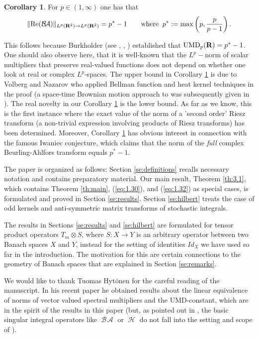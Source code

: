 \documentclass[11pt,a4paper,twoside,draft]{amsart}
\theoremstyle{definition}
\newtheorem{corollary}[lemma]{Corollary}
\newcommand{\real}{{\bf R}}
\DeclareMathOperator{\htt}{{\mathcal H}}
\DeclareMathOperator{\ba}{{\mathcal B\!\mathcal A}}
\DeclareMathOperator{\umd}{{\rm UMD}}
\newcommand{\refeq}[1]{(\ref{#1})}
\begin{document}
\begin{corollary}\label{cor:nice}
For $p\in (1,\infty)$ one has that
\[   \|{\rm Re}(\ba) \|_{L^p(\real^2)\to L^p(\real^2)}
   = p^*-1
   \qquad \mbox{where}\;\; 
   p^*:=\max \left (p,\frac{p}{p-1}\right ). \]
\end{corollary}
\noindent This follows  because Burkholder 
(see \cite{Burk5},
     \cite[Theorem 14]{Burk3},
     \cite[p.12]{Burk4}) 
established that 
$\umd_p(\real )=p^*-1$. One should also observe here, that it is well-known that the $L^p-$norm of
scalar multipliers that preserve real-valued functions does not depend on whether one look at
real or complex $L^p$-spaces. The upper bound in Corollary \ref{cor:nice} is due to
Volberg and Nazarov \cite[Theorem 3.1]{Volberg} who applied Bellman function and heat kernel techniques
in the proof (a space-time Brownian motion approach 
to  \cite[Theorem 3.1]{Volberg} was subsequently 
given in \cite{Ban2}).
The real novelty in our Corollary \ref{cor:nice} is the lower bound. As far as we
know, this is the first instance where the exact value of the  norm of a 'second order' Riesz transform
(a non-trivial expression involving products of Riesz transforms) has been determined.
Moreover,  Corollary \ref{cor:nice} has obvious interest in connection with the
 famous Iwaniec conjecture, which claims that the norm of the {\it full} complex Beurling-Ahlfors transform equals $p^* -1.$ 


The paper is organized as follows:
Section \ref{se:definitions} recalls necessary notation and contains
preparatory material. Our main result, Theorem \ref{th:3.1}, which
contains Theorem \ref{th:main}, \refeq{eq:1.30}, and \refeq{eq:1.32} as  
special cases, is formulated and proved in Section \ref{se:results}.  
Section \ref{se:hilbert} treats the case of odd kernels and
anti-symmetric matrix transforms of stochastic integrals. 

The results in Sections \ref{se:results} and \ref{se:hilbert} are formulated for
tensor product operators $T_m\otimes S$, where $S: X\to Y$ is an arbitrary
operator between two Banach spaces $X$ and $Y$, instead for the setting of
identities $Id_X$ we have used so far in the introduction.
The motivation for this are certain connections to the geometry of Banach spaces
that are explained in Section \ref{se:remarks}.

We would like to thank Tuomas Hyt\"onen for the careful reading of the
manuscript. In his recent paper \cite{Hyt} he obtained results about the
linear equivalence of norms of vector valued spectral multipliers 
and the UMD-constant, which are in the spirit of the results in this 
paper (but, as pointed out in \cite{Hyt}, the basic singular integral operators
like $\ba$ or $\htt$ do not fall into the setting and scope of \cite{Hyt}).  
\end{document}

